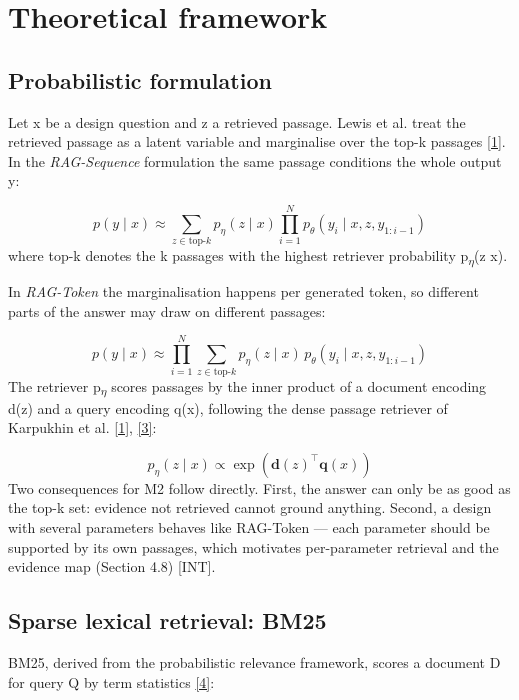 \documentclass[11pt,a4paper]{article}
\newcommand{\prov}[1]{\textsf{\footnotesize[#1]}}
\begin{document}
\section{Theoretical framework}
\subsection{Probabilistic formulation}
Let x be a design question and z a retrieved passage. Lewis et al. treat the retrieved passage as a latent variable and marginalise over the top-k passages \hyperlink{ref1}{[1]}. In the \textit{RAG-Sequence} formulation the same passage conditions the whole output y:

\begin{equation*}
p(y \mid x) \approx \sum_{z \in \text{top-}k} p_{\eta}(z \mid x) \prod_{i=1}^{N} p_{\theta}\!\left(y_i \mid x, z, y_{1:i-1}\right)
\end{equation*}
where top-k denotes the k passages with the highest retriever probability p\textsubscript{\ensuremath{\eta}}(z \textbar{} x).

In \textit{RAG-Token} the marginalisation happens per generated token, so different parts of the answer may draw on different passages:

\begin{equation*}
p(y \mid x) \approx \prod_{i=1}^{N} \sum_{z \in \text{top-}k} p_{\eta}(z \mid x)\, p_{\theta}\!\left(y_i \mid x, z, y_{1:i-1}\right)
\end{equation*}
The retriever p\textsubscript{\ensuremath{\eta}} scores passages by the inner product of a document encoding d(z) and a query encoding q(x), following the dense passage retriever of Karpukhin et al. \hyperlink{ref1}{[1]}, \hyperlink{ref3}{[3]}:

\begin{equation*}
p_{\eta}(z \mid x) \propto \exp\!\left(\mathbf{d}(z)^{\top} \mathbf{q}(x)\right)
\end{equation*}
Two consequences for M2 follow directly. First, the answer can only be as good as the top-k set: evidence not retrieved cannot ground anything. Second, a design with several parameters behaves like RAG-Token --- each parameter should be supported by its own passages, which motivates per-parameter retrieval and the evidence map (Section 4.8) \prov{INT}.

\subsection{Sparse lexical retrieval: BM25}
BM25, derived from the probabilistic relevance framework, scores a document D for query Q by term statistics \hyperlink{ref4}{[4]}:
\end{document}
